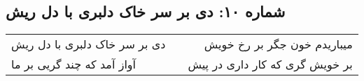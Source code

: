 \begin{center}
\section*{شماره ۱۰: دی بر سر خاک دلبری با دل ریش}
\label{sec:010}
\begin{longtable}{l p{0.5cm} r}
دی بر سر خاک دلبری با دل ریش
&&
میباریدم خون جگر بر رخ خویش
\\
آواز آمد که چند گریی بر ما
&&
بر خویش گری که کار داری در پیش
\\
\end{longtable}
\end{center}
